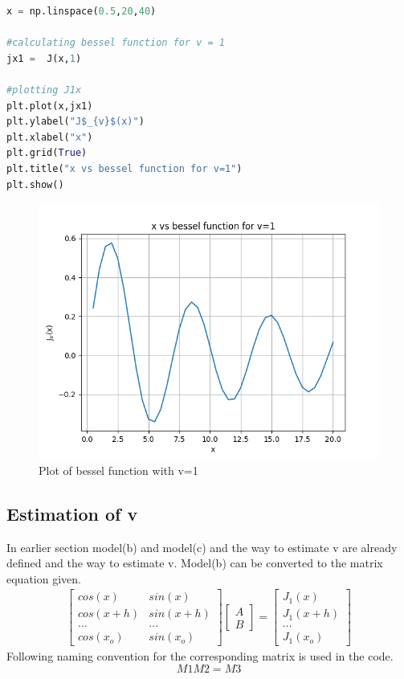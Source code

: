 \documentclass[a4paper]{article}
\begin{document}
\begin{lstlisting}[language=Python ,caption=Plotting the functions]
x = np.linspace(0.5,20,40)

#calculating bessel function for v = 1
jx1 =  J(x,1)

#plotting J1x
plt.plot(x,jx1)
plt.ylabel("J$_{v}$(x)")
plt.xlabel("x")
plt.grid(True)
plt.title("x vs bessel function for v=1")
plt.show()
\end{lstlisting}
\begin{figure}
\includegraphics[width=\columnwidth]{Figure_1.png}
\caption{Plot of bessel function with v=1}
\end{figure}

\subsection{Estimation of  v}
In earlier section model(b) and model(c) and the way to estimate v are already defined and the way to estimate v. Model(b) can be converted to the matrix equation given.
\begin{gather}
 \begin{bmatrix} cos(x) & sin(x) \\  cos(x+h) & sin(x+h)  \\ ... & ... \\cos(x_{o}) & sin(x_{o}) \end{bmatrix}
 \begin{bmatrix}
 A\\ B 
 \end{bmatrix}
 =
  \begin{bmatrix}
 J_{1}(x) \\ J_{1}(x+h) \\ ... \\ J_{1}(x_{o})
   \end{bmatrix}
\end{gather}
Following naming convention for the corresponding matrix is used in the code.
$$ M1 M2 = M3 $$
\end{document}
